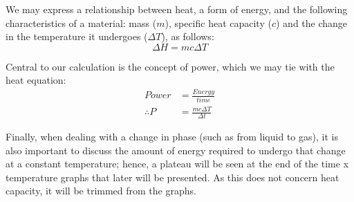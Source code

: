 We may express a relationship between heat, a form of energy, and the following characteristics of a material: mass ($m$), specific heat capacity ($c$) and the change in the temperature it undergoes ($\Delta T$), as follows:
\begin{equation*}
	\Delta H = mc \Delta  T
\end{equation*}

Central to our calculation is the concept of power, which we may tie with the heat equation:
\begin{equation}\label{eq:Power}
\begin{split}
	Power &= \frac{Energy}{time} \\
	\therefore P &= \frac{mc\Delta T}{\Delta t}
\end{split}
\end{equation}

Finally, when dealing with a change in phase (such as from liquid to gas), it is also important to discuss the amount of energy required to undergo that change at a constant temperature; hence, a plateau will be seen at the end of the time x temperature graphs that later will be presented. As this does not concern heat capacity, it will be trimmed from the graphs.